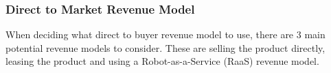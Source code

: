 \documentclass[11pt]{article}		%
\newcommand{\supercite}[1]{\textsuperscript{\cite{#1}}}		%
\begin{document}
            
            
            \subsubsection{Direct to Market Revenue Model}
            
            When deciding what direct to buyer revenue model to use, there are 3 main potential revenue models to consider. These are selling the product directly, leasing the product and using a Robot-as-a-Service (RaaS) revenue model.
            
\end{document}
